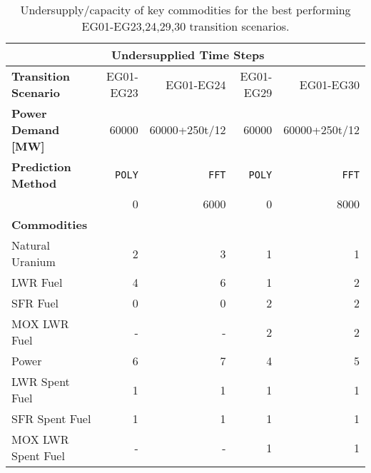 \begin{table}[]
	\centering
        \caption{Undersupply/capacity of key commodities for the best performing EG01-EG23,24,29,30 transition scenarios.}
		\label{tab:all-power}
		\footnotesize
        \begin{tabular}{l|rrrr}
		\hline
		& \multicolumn{3}{c}{\textbf{Undersupplied Time Steps}} \\ \hline
		\textbf{Transition Scenario} & EG01-EG23 & 
		EG01-EG24 & EG01-EG29 & 
		EG01-EG30 \\ 
		\textbf{Power Demand [MW]} &60000&60000+250t/12&60000&60000+250t/12 \\
		\textbf{Prediction Method} &\texttt{POLY}&\texttt{FFT}&\texttt{POLY}& \texttt{FFT}\\
		\textbf{\shortstack{Power Buffer [MW]}} &0&6000&0&8000 \\ \hline
		\textbf{Commodities} \\ 
		Natural Uranium		    & 2 	& 3  &  1  & 1 \\ 
		\gls{LWR} Fuel     	    & 4 	& 6  &  1  & 2\\ 
		\gls{SFR} Fuel     	    &  0 	& 0  &  2  & 2\\ 
		\gls{MOX} \gls{LWR} Fuel &-&-&2&2 \\
		Power      				&  6 	& 7  &  4 &  5\\ 
		\gls{LWR} Spent Fuel	& 1 	& 1  & 1 & 1\\ 
		\gls{SFR} Spent Fuel     	    &  1 	& 1  &  1  & 1\\ 
		\gls{MOX} \gls{LWR} Spent Fuel &-&-&1&1 \\ \hline 
	\end{tabular}
\end{table}
